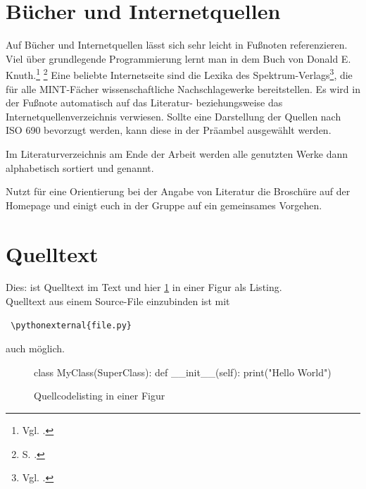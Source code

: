 \section{Bücher und Internetquellen}
Auf Bücher und Internetquellen lässt sich sehr leicht in Fußnoten referenzieren.\\ 
Viel über grundlegende Programmierung lernt man in dem Buch von Donald E. Knuth.\footnote{Vgl. \cite{book:knuth97}.} \footnote{S. \cite[S. 57]{book:knuth97}.} 
Eine beliebte Internetseite sind die Lexika des Spektrum-Verlags\footnote{Vgl. \cite{online:spektrumlex}.}, die für alle MINT-Fächer wissenschaftliche Nachschlagewerke bereitstellen.
Es wird in der Fußnote automatisch auf das Literatur- beziehungsweise das Internetquellenverzeichnis verwiesen. 
Sollte eine Darstellung der Quellen nach ISO 690 bevorzugt werden, kann diese in der Präambel ausgewählt werden.

Im Literaturverzeichnis am Ende der Arbeit werden alle genutzten Werke dann alphabetisch sortiert und genannt.

Nutzt für eine Orientierung bei der Angabe von Literatur die Broschüre auf der Homepage und einigt euch in der Gruppe auf ein gemeinsames Vorgehen.

\section{Quelltext}
Dies:  ist Quelltext im Text und hier \ref{listing:code} in einer Figur als Listing.\\
Quelltext aus einem Source-File einzubinden ist mit
\begin{verbatim}
 \pythonexternal{file.py}
\end{verbatim}
auch möglich.

\begin{figure}[h!]
\centering
\begin{python}
class MyClass(SuperClass):
    def __init__(self):
        print("Hello World")
\end{python}
\caption{Quellcodelisting in einer Figur}
\label{listing:code}
\end{figure}
